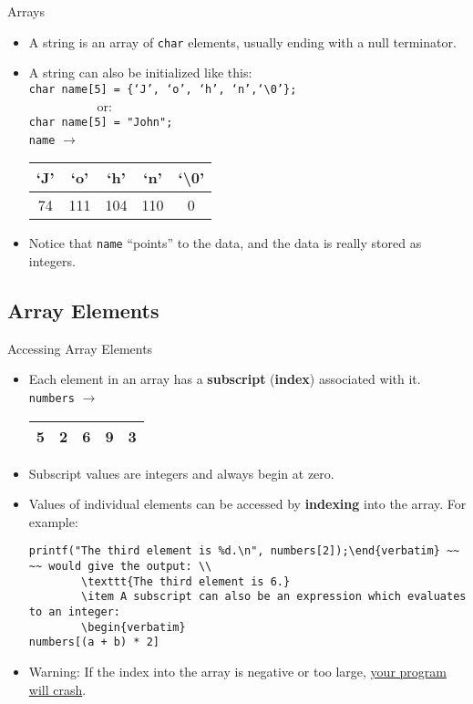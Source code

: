 \documentclass[graphics]{beamer}
\begin{document}
\begin{frame}{Arrays}
{\begin{itemize}
            \item A string is an array of \texttt{char} elements, usually ending with a null terminator.
            \item A string can also be initialized like this:\\ \texttt{char name[5] = \{`J', `o', `h', `n',`\textbackslash0'\};} \\ ~~ ~~ ~~ ~~ or: \\
            \texttt{char name[5] = "John";} \\
            \texttt{name} $\rightarrow$
            \begin{tabular}{|c|c|c|c|c|}
                \hline
                `J' & `o' & `h' & `n' & `\textbackslash0' \\
                \hline
                74 & 111 & 104 & 110 & 0 \\
                \hline
            \end{tabular}
            \item Notice that \texttt{name} ``points'' to the data, and the data is really stored as integers.
        \end{itemize}
    }
\end{frame}

\subsection{Array Elements}
\begin{frame}[fragile]{Accessing Array Elements}
    \begin{itemize}
        \item Each element in an array has a \textbf{subscript} (\textbf{index}) associated with it.
        \texttt{numbers} $\rightarrow$
        \begin{tabular}{|c|c|c|c|c|}
            \hline
            5 & 2 & 6 & 9 & 3 \\
            \hline
        \end{tabular}
        \item Subscript values are integers and always begin at zero.
        \item Values of individual elements can be accessed by \textbf{indexing} into the array. For example: 
        \begin{verbatim}
printf("The third element is %d.\n", numbers[2]);\end{verbatim} ~~ ~~ would give the output: \\
        \texttt{The third element is 6.}
        \item A subscript can also be an expression which evaluates to an integer:
        \begin{verbatim}
numbers[(a + b) * 2]\end{verbatim}
        \item Warning: If the index into the array is negative or too large, \underline{your program will crash}.
    \end{itemize}
\end{frame}
\end{document}
